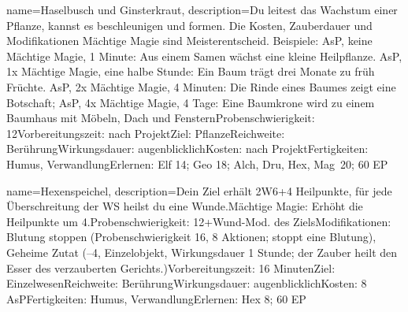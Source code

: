 {
    name={Haselbusch und Ginsterkraut},
    description={Du leitest das Wachstum einer Pflanze, kannst es beschleunigen und formen. Die Kosten, Zauberdauer und Modifikationen Mächtige Magie sind Meisterentscheid. Beispiele: AsP, keine Mächtige Magie, 1 Minute: Aus einem Samen wächst eine kleine Heilpflanze. AsP, 1x Mächtige Magie, eine halbe Stunde: Ein Baum trägt drei Monate zu früh Früchte. AsP, 2x Mächtige Magie, 4 Minuten: Die Rinde eines Baumes zeigt eine Botschaft; AsP, 4x Mächtige Magie, 4 Tage: Eine Baumkrone wird zu einem Baumhaus mit Möbeln, Dach und Fenstern\newline Probenschwierigkeit: 12\newline Vorbereitungszeit: nach Projekt\newline Ziel: Pflanze\newline Reichweite: Berührung\newline Wirkungsdauer: augenblicklich\newline Kosten: nach Projekt\newline Fertigkeiten: Humus, Verwandlung\newline Erlernen: Elf 14; Geo 18; Alch, Dru, Hex, Mag 20; 60 EP}
}


{
    name={Hexenspeichel},
    description={Dein Ziel erhält 2W6+4 Heilpunkte, für jede Überschreitung der WS heilst du eine Wunde.\newline Mächtige Magie: Erhöht die Heilpunkte um 4.\newline Probenschwierigkeit: 12+Wund-Mod. des Ziels\newline Modifikationen: Blutung stoppen (Probenschwierigkeit 16, 8 Aktionen; stoppt eine Blutung), Geheime Zutat (–4, Einzelobjekt, Wirkungsdauer 1 Stunde; der Zauber heilt den Esser des verzauberten Gerichts.)\newline Vorbereitungszeit: 16 Minuten\newline Ziel: Einzelwesen\newline Reichweite: Berührung\newline Wirkungsdauer: augenblicklich\newline Kosten: 8 AsP\newline Fertigkeiten: Humus, Verwandlung\newline Erlernen: Hex 8; 60 EP}
}


